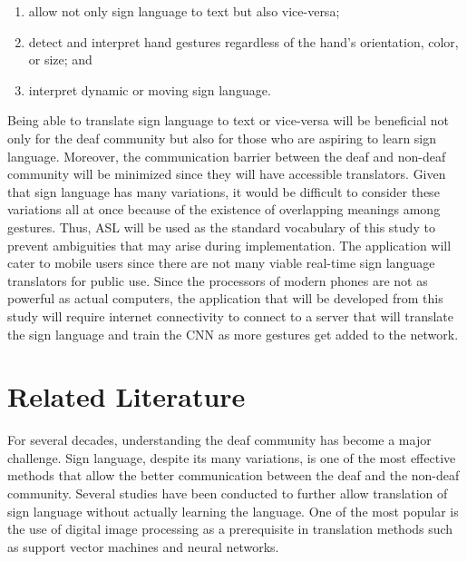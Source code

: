 \documentclass[journal]{./IEEE/IEEEtran}
\begin{document}
\begin{enumerate}
\item allow not only sign language to text but also vice-versa;
\item detect and interpret hand gestures regardless of the hand's orientation, color, or size; and
\item interpret dynamic or moving sign language.
\end{enumerate}

\indent Being able to translate sign language to text or vice-versa will be beneficial not only for the deaf community but also for those who are aspiring to learn sign language. Moreover, the communication barrier between the deaf and non-deaf community will be minimized since they will have accessible translators.
\newline
\indent Given that sign language has many variations, it would be difficult to consider these variations all at once because of the existence of overlapping meanings among gestures. Thus, ASL will be used as the standard vocabulary of this study to prevent ambiguities that may arise during implementation.
\newline
\indent The application will cater to mobile users since there are not many viable real-time sign language translators for public use. Since the processors of modern phones are not as powerful as actual computers, the application that will be developed from this study will require internet connectivity to connect to a server that will translate the sign language and train the CNN as more gestures get added to the network.

\section{Related Literature}
For several decades, understanding the deaf community has become a major challenge. Sign language, despite its many variations, is one of the most effective methods that allow the better communication between the deaf and the non-deaf community. Several studies have been conducted to further allow translation of sign language without actually learning the language. One of the most popular is the use of digital image processing as a prerequisite in translation methods such as support vector machines and neural networks.
\end{document}
